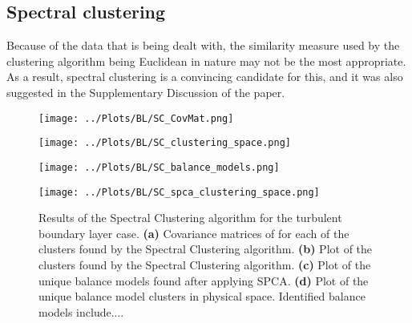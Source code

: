\documentclass[12pt]{report} %
\begin{document}
\subsection{Spectral clustering}

Because of the data that is being dealt with, the similarity measure used by the clustering algorithm being Euclidean in nature may not be the most appropriate. As a result, spectral clustering is a convincing candidate for this, and it was also suggested in the Supplementary Discussion of the paper\cite[Supplementary Information]{callaham2021learning}.

\begin{figure}[htbp]
  \centering

  \begin{minipage}{0.7\textwidth}
    \centering
    \texttt{[image: ../Plots/BL/SC\_CovMat.png]}
    \subcaption{}
  \end{minipage}

  \begin{minipage}{\textwidth}
      \begin{minipage}[b]{0.6\textwidth}
          \centering
          \texttt{[image: ../Plots/BL/SC\_clustering\_space.png]}
          \subcaption{}
      \end{minipage}
      \begin{minipage}[b]{0.35\textwidth}
          \centering
          \texttt{[image: ../Plots/BL/SC\_balance\_models.png]}
          \subcaption{}
      \end{minipage}
  \end{minipage}

  \begin{minipage}{0.7\textwidth}
      \centering
      \texttt{[image: ../Plots/BL/SC\_spca\_clustering\_space.png]}
      \subcaption{}
  \end{minipage}

  \caption{Results of the Spectral Clustering algorithm for the turbulent boundary layer case. \textbf{(a)} Covariance matrices of for each of the clusters found by the Spectral Clustering algorithm. \textbf{(b)} Plot of the clusters found by the Spectral Clustering algorithm. \textbf{(c)} Plot of the unique balance models found after applying SPCA. \textbf{(d)} Plot of the unique balance model clusters in physical space. Identified balance models include....}

  \label{fig:SC_results}
\end{figure}
\end{document}
